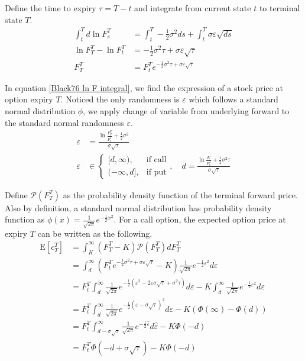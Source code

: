 \documentclass{article}
\begin{document}
Define the time to expiry $ \tau = T - t$ and integrate from current state $ t $ to terminal state $ T $.
\begin{align}\label{Black76 ln F integral}
    \int_{t}^{T} d\ln{F_s^T} &= \int_{t}^{T} -\frac{1}{2} \sigma^2 ds + \int_{t}^{T} \sigma \varepsilon \sqrt{ds} \nonumber\\
    \ln{F_T^T} - \ln{F_t^T} &= -\frac{1}{2} \sigma^2 \tau + \sigma \varepsilon \sqrt{\tau} \nonumber\\
    F_T^T &= F_t^T e^{-\frac{1}{2} \sigma^2 \tau + \sigma  \varepsilon \sqrt{\tau}}
\end{align}

In equation \ref{Black76 ln F integral}, we find the expression of a stock price at option expiry $ T $.
Noticed the only randomness is $ \varepsilon $ which follows a standard normal distribution $ \phi $, we apply change of variable from underlying forward to the standard normal randomness $ \varepsilon $.
\begin{align}\label{Black76 epsilon interval}
    \varepsilon &= \frac{\ln{\frac{F_T^T}{F_t^T}} + \frac{1}{2} \sigma^2}{\sigma \sqrt{\tau}} \nonumber \\
    \varepsilon &\in
    \begin{cases}
        [d, \infty), & \mbox{if call} \\
        (-\infty, d], & \mbox{if put}
    \end{cases}, \quad
    d = \frac{\ln{\frac{K}{F_t^T}} + \frac{1}{2} \sigma^2 \tau}{\sigma \sqrt{\tau}}
\end{align}

Define $ \mathcal{P} (F_T^T) $ as the probability density function of the terminal forward price.
Also by definition, a standard normal distribution has probability density function as $ \phi(x) = \frac{1}{\sqrt{2 \pi}} e^{-\frac{1}{2} x^2} $.
For a call option, the expected option price at expiry $ T $ can be written as the following. 
\begin{align}\label{Call option price derivation}
    \mathrm{E} \left[c_T^T \right] &= \int_{K}^{\infty} (F_T^T - K) \mathcal{P} (F_T^T) d F_T^T \nonumber \\
    &= \int_{d}^{\infty} (F_t^T e^{-\frac{1}{2} \sigma^2 \tau + \sigma \varepsilon \sqrt{\tau}} - K) \frac{1}{\sqrt{2 \pi}} e^{-\frac{1}{2} \varepsilon^2} d \varepsilon \nonumber \\
    &= F_t^T \int_{d}^{\infty} \frac{1}{\sqrt{2 \pi}} e^{-\frac{1}{2} (\varepsilon^2 - 2 \varepsilon \sigma \sqrt{\tau} + \sigma^2 \tau)} d \varepsilon - K \int_{d}^{\infty} \frac{1}{\sqrt{2 \pi}} e^{-\frac{1}{2} \varepsilon^2} d \varepsilon \nonumber \\
    &= F_t^T \int_{d}^{\infty} \frac{1}{\sqrt{2 \pi}} e^{-\frac{1}{2} (\varepsilon - \sigma \sqrt{\tau})^2} d \varepsilon - K (\Phi(\infty) - \Phi(d)) \nonumber \\
    &= F_t^T \int_{d - \sigma \sqrt{\tau}}^{\infty} \frac{1}{\sqrt{2 \pi}} e^{-\frac{1}{2} \hat{\varepsilon}} d \hat{\varepsilon} - K \Phi (-d) \nonumber \\
    &= F_t^T \Phi(-d + \sigma \sqrt{\tau}) - K \Phi(-d)
\end{align}
\end{document}
